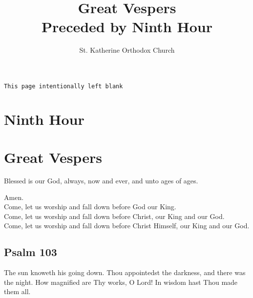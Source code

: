 \documentclass[twoside, letterpaper, 12pt]{report}
\newcommand{\instruction}[1]{%
  \texttt{\scriptsize{#1}}%
}
\newcommand{\centeredsection}[1]{%
  \needspace{10\baselineskip}%
  \section*{\centering{}#1}%
}
\newenvironment{maybetwocolumns}
{\ifdim \textwidth > 7in \begin{multicols}{2}\fi}
{\ifdim \textwidth > 7in \end{multicols}{2}\fi}
\begin{document}

\title{Great Vespers\\
Preceded by Ninth Hour}

\author{St. Katherine Orthodox Church}
\date{}%
\maketitle

\instruction{This page intentionally left blank}

\cleardoublepage
\chapter*{Ninth Hour}

\begin{maybetwocolumns}
\end{maybetwocolumns}

\cleardoublepage
\chapter*{Great Vespers}
\begin{priest}
\item Blessed is our God, always, now and ever, and unto ages of ages.
\end{priest}

\begin{reader}
\item Amen.\\
    Come, let us worship and fall down before God our King.\\
    Come, let us worship and fall down before Christ, our King and our God.\\
    Come, let us worship and fall down before Christ Himself, our King and our God.\\
\end{reader}

\centeredsection{Psalm 103}
\begin{maybetwocolumns}


The sun knoweth his going down.
Thou appointedst the darkness, and there was the night.
How magnified are Thy works, O Lord! In wisdom hast Thou made them all.
\end{maybetwocolumns}
\end{document}
